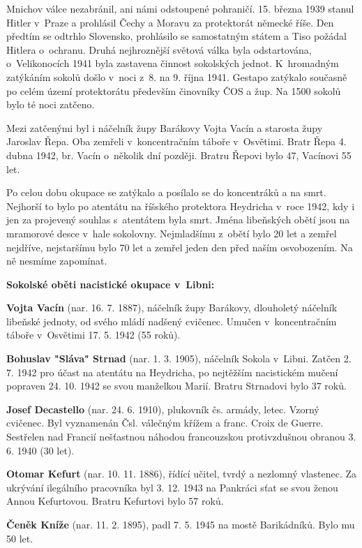 \documentclass[a5paper, 12pt, twoside]{article}
\begin{document}
Mnichov válce nezabránil, ani námi odstoupené pohraničí. 15. března 1939
stanul Hitler v~Praze a prohlásil Čechy a Moravu za protektorát německé
říše. Den předtím se odtrhlo Slovensko, prohlásilo se samostatným státem
a Tiso požádal Hitlera o~ochranu. Druhá nejhroznější světová válka byla
odstartována, o~Velikonocích 1941 byla zastavena činnost sokolských
jednot. K~hromadným zatýkáním sokolů došlo v~noci z~8. na 9. října 1941.
Gestapo zatýkalo současně po celém území protektorátu především
činovníky ČOS a žup. Na 1500 sokolů bylo té noci zatčeno.

Mezi zatčenými byl i náčelník župy Barákovy Vojta Vacín a starosta župy
Jaroslav Řepa. Oba zemřeli v~koncentračním táboře v~Osvětimi. Bratr Řepa
4. dubna 1942, br. Vacín o~několik dní později. Bratru Řepovi bylo 47,
Vacínovi 55 let.

Po celou dobu okupace se zatýkalo a posílalo se do koncentráků a na
smrt. Nejhorší to bylo po atentátu na říšského protektora Heydricha
v~roce 1942, kdy i jen za projevený souhlas s~atentátem byla smrt. Jména
libeňských obětí jsou na mramorové desce v~hale sokolovny. Nejmladšímu
z~obětí bylo 20 let a zemřel nejdříve, nejstaršímu bylo 70 let a zemřel
jeden den před naším osvobozením. Na ně nesmíme zapomínat.

\textbf{Sokolské oběti nacistické okupace v~Libni:}

\textbf{Vojta Vacín} (nar. 16. 7. 1887), náčelník župy Barákovy,
dlouholetý náčelník libeňské jednoty, od svého mládí nadšený cvičenec.
Umučen v~koncentračním táboře v~Osvětimi 17. 5. 1942 (55 roků).

\textbf{Bohuslav "Sláva" Strnad} (nar. 1. 3. 1905), náčelník Sokola
v~Libni. Zatčen 2. 7. 1942 pro účast na atentátu na Heydricha, po
nejtěžším nacistickém mučení popraven 24. 10. 1942 se svou manželkou
Marií. Bratru Strnadovi bylo 37 roků.

\textbf{Josef Decastello} (nar. 24. 6. 1910), plukovník čs. armády,
letec. Vzorný cvičenec. Byl vyznamenán Čsl. válečným křížem a franc.
Croix de Guerre. Sestřelen nad Francií nešťastnou náhodou
francouzskou protivzdušnou obranou 3. 6. 1940 (30 let).

\textbf{Otomar Kefurt} (nar. 10. 11. 1886), řídící učitel, tvrdý a
nezlomný vlastenec. Za ukrývání ilegálního pracovníka byl 3. 12. 1943 na
Pankráci sťat se svou ženou Annou Kefurtovou. Bratru Kefurtovi bylo 57
roků.

\textbf{Čeněk Kníže} (nar. 11. 2. 1895), padl 7. 5. 1945 na mostě
Barikádníků. Bylo mu 50 let.
\end{document}
